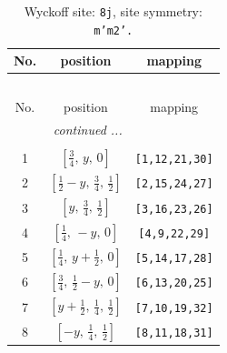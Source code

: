 \documentclass[fleqn,8pt]{jsarticle}
\begin{document}
\begin{longtable}{ccc}
\caption{Wyckoff site: {\tt 8j}, site symmetry: {\tt m'm2'.}}
 \\
 \hline \hline
No. & position & mapping \\ \hline \endfirsthead

\multicolumn{2}{l}{\tablename\ \thetable{}} \\
 \hline \hline
No. & position & mapping \\ \hline \endhead

 \hline \hline
\multicolumn{2}{r}{\footnotesize\it continued ...} \\ \endfoot

 \hline \hline
\multicolumn{2}{r}{} \\ \endlastfoot

1 & $\left[ \frac{3}{4},\, y,\, 0 \right]$ & {\tt [1,12,21,30]} \\ \hline
2 & $\left[ \frac{1}{2} - y,\, \frac{3}{4},\, \frac{1}{2} \right]$ & {\tt [2,15,24,27]} \\ \hline
3 & $\left[ y,\, \frac{3}{4},\, \frac{1}{2} \right]$ & {\tt [3,16,23,26]} \\ \hline
4 & $\left[ \frac{1}{4},\, - y,\, 0 \right]$ & {\tt [4,9,22,29]} \\ \hline
5 & $\left[ \frac{1}{4},\, y + \frac{1}{2},\, 0 \right]$ & {\tt [5,14,17,28]} \\ \hline
6 & $\left[ \frac{3}{4},\, \frac{1}{2} - y,\, 0 \right]$ & {\tt [6,13,20,25]} \\ \hline
7 & $\left[ y + \frac{1}{2},\, \frac{1}{4},\, \frac{1}{2} \right]$ & {\tt [7,10,19,32]} \\ \hline
8 & $\left[ - y,\, \frac{1}{4},\, \frac{1}{2} \right]$ & {\tt [8,11,18,31]} \\
\end{longtable}
\renewcommand{\arraystretch}{1.2}
\end{document}
